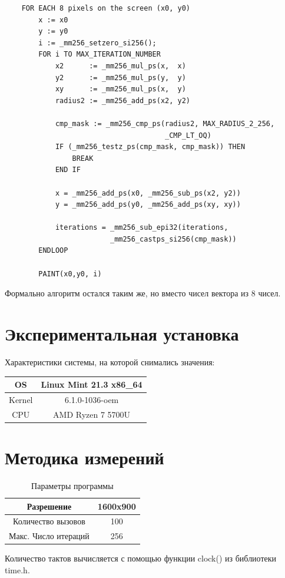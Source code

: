 \documentclass[a4paper, 12pt]{article}
\begin{document}
\begin{lstlisting}
    FOR EACH 8 pixels on the screen (x0, y0)
        x := x0
        y := y0
        i := _mm256_setzero_si256();
        FOR i TO MAX_ITERATION_NUMBER
            x2      := _mm256_mul_ps(x,  x)
            y2      := _mm256_mul_ps(y,  y)
            xy      := _mm256_mul_ps(x,  y)
            radius2 := _mm256_add_ps(x2, y2)
    
            cmp_mask := _mm256_cmp_ps(radius2, MAX_RADIUS_2_256,
                                      _CMP_LT_OQ)
            IF (_mm256_testz_ps(cmp_mask, cmp_mask)) THEN
                BREAK
            END IF
    
            x = _mm256_add_ps(x0, _mm256_sub_ps(x2, y2))
            y = _mm256_add_ps(y0, _mm256_add_ps(xy, xy))
    
            iterations = _mm256_sub_epi32(iterations,
                         _mm256_castps_si256(cmp_mask))
        ENDLOOP
    
        PAINT(x0,y0, i)
\end{lstlisting}
Формально алгоритм остался таким же, но вместо чисел вектора из 8 чисел.

\section*{Экспериментальная установка}
Характеристики системы, на которой снимались значения:
\begin{table}[h]
    \centering
    \begin{tabular}{|c|c|}
        \hline
        OS         & Linux Mint 21.3 x86\_64 \\\hline
        Kernel     & 6.1.0-1036-oem          \\\hline
        CPU        & AMD Ryzen 7 5700U       \\\hline
    \end{tabular}
\end{table}


\section*{Методика измерений}
\begin{table}[h]
    \centering
    \begin{tabular}{|c|c|}
        \hline
        Разрешение           & 1600x900 \\\hline
        Количество вызовов   & 100      \\\hline
        Макс. Число итераций & 256      \\\hline
    \end{tabular}
    \caption{Параметры программы}
\end{table}
Количество тактов вычисляется с помощью функции clock() из библиотеки time.h.\\
\end{document}

